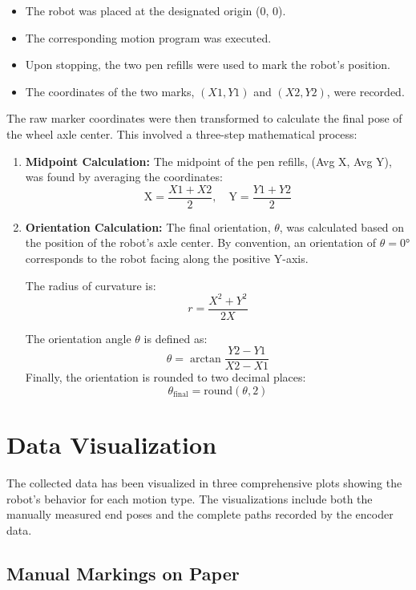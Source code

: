 \begin{itemize}
    \item The robot was placed at the designated origin (0, 0).
    \item The corresponding motion program was executed.
    \item Upon stopping, the two pen refills were used to mark the robot's position.
    \item The coordinates of the two marks, $(X1, Y1)$ and $(X2, Y2)$, were recorded.
\end{itemize}

The raw marker coordinates were then transformed to calculate the final pose of the wheel axle center. This involved a three-step mathematical process:

\begin{enumerate}
    \item \textbf{Midpoint Calculation:} The midpoint of the pen refills, (Avg X, Avg Y), was found by averaging the coordinates:
    \[
    \text{X} = \frac{X1 + X2}{2}, \quad \text{Y} = \frac{Y1 + Y2}{2}
    \]

    \item \textbf{Orientation Calculation:} The final orientation, $\theta$, was calculated based on the position of the robot's axle center. By convention, an orientation of $\theta = 0°$ corresponds to the robot facing along the positive Y-axis.
    
    The radius of curvature is:
    \[
    r = \frac{X^2 + Y^2}{2X}
    \]
    
    The orientation angle $\theta$ is defined as:
    \[
    \theta = \arctan{\frac{Y2 - Y1}{X2 - X1}}
    \]
    Finally, the orientation is rounded to two decimal places:
    \[
    \theta_{\text{final}} = \text{round}(\theta, 2)
    \]
\end{enumerate}


\section{Data Visualization}

The collected data has been visualized in three comprehensive plots showing the robot's behavior for each motion type. The visualizations include both the manually measured end poses and the complete paths recorded by the encoder data.

\subsection{Manual Markings on Paper}

